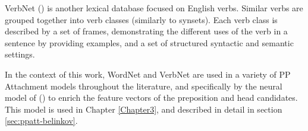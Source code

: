 VerbNet (\cite{Schuler:05:VBC:1104493}) is another lexical database focused on English verbs. Similar verbs are grouped together into verb classes (similarly to synsets). Each verb class is described by a set  of frames, demonstrating the different uses of the verb in a sentence by providing examples, and a set of structured syntactic and semantic settings. 

In the context of this work, WordNet and VerbNet are used in a variety of PP Attachment models throughout the literature, and specifically by the neural model of (\cite{hpcd}) to enrich the feature vectors of the preposition and head candidates. This model is used in Chapter \ref{Chapter3}, and described in detail in section \ref{sec:ppatt-belinkov}.

\pagebreak